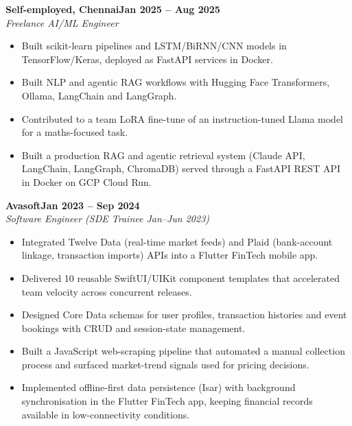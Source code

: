 \documentclass[a4paper,11pt]{article}
\newcommand{\entry}[4]{\needspace{4\baselineskip}\noindent\textbf{#1}\hfill\textbf{#2}\\ \textit{#3}\hfill\textit{#4}\par}
\begin{document}
\vspace{4pt}
\entry{Self-employed, Chennai}{Jan 2025 – Aug 2025}{Freelance AI/ML Engineer}{}
\begin{itemize}
  \item Built scikit-learn pipelines and LSTM/BiRNN/CNN models in TensorFlow/Keras, deployed as FastAPI services in Docker.
  \item Built NLP and agentic RAG workflows with Hugging Face Transformers, Ollama, LangChain and LangGraph.
  \item Contributed to a team LoRA fine-tune of an instruction-tuned Llama model for a maths-focused task.
  \item Built a production RAG and agentic retrieval system (Claude API, LangChain, LangGraph, ChromaDB) served through a FastAPI REST API in Docker on GCP Cloud Run.
\end{itemize}
\vspace{4pt}
\entry{Avasoft}{Jan 2023 – Sep 2024}{Software Engineer (SDE Trainee Jan–Jun 2023)}{}
\begin{itemize}
  \item Integrated Twelve Data (real-time market feeds) and Plaid (bank-account linkage, transaction imports) APIs into a Flutter FinTech mobile app.
  \item Delivered 10 reusable SwiftUI/UIKit component templates that accelerated team velocity across concurrent releases.
  \item Designed Core Data schemas for user profiles, transaction histories and event bookings with CRUD and session-state management.
  \item Built a JavaScript web-scraping pipeline that automated a manual collection process and surfaced market-trend signals used for pricing decisions.
  \item Implemented offline-first data persistence (Isar) with background synchronisation in the Flutter FinTech app, keeping financial records available in low-connectivity conditions.
\end{itemize}

\end{document}
